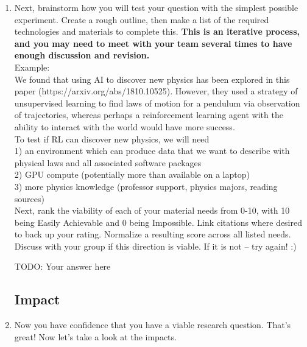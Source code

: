 \documentclass[letterpaper,11pt]{article}
\begin{document}
\begin{enumerate}
\item
Next, brainstorm how you will test your question with the simplest possible experiment. Create a rough outline, then make a list of the required technologies and materials to complete this. \textbf{This is an iterative process, and you may need to meet with your team several times to have enough discussion and revision.} \\
Example:\\
We found that using AI to discover new physics has been explored in this paper (https://arxiv.org/abs/1810.10525). However, they used a strategy of unsupervised learning to find laws of motion for a pendulum via observation of trajectories, whereas perhaps a reinforcement learning agent with the ability to interact with the world would have more success.\\
To test if RL can discover new physics, we will need \\
1) an environment which can produce data that we want to describe with physical laws and all associated software packages \\
2) GPU compute (potentially more than available on a laptop) \\
3) more physics knowledge (professor support, physics majors, reading sources)\\
\newline
Next, rank the viability of each of your material needs from 0-10, with 10 being Easily Achievable and 0 being Impossible. Link citations where desired to back up your rating. Normalize a resulting score across all listed needs. Discuss with your group if this direction is viable. If it is not -- try again! :)
\begin{tcolorbox}
TODO: Your answer here
\newline
\newline
\newline
\newline
\newline
\newline
\newline
\newline
\newline
\end{tcolorbox}

\subsection{Impact}
\item
Now you have confidence that you have a viable research question. That's great! Now let's take a look at the impacts.


\end{enumerate}
\end{document}

